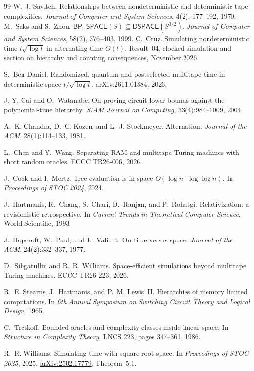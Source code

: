 \documentclass[11pt]{article}
\theoremstyle{remark}
\begin{document}
\begin{thebibliography}{99}
W.~J. Savitch. Relationships between nondeterministic and deterministic
tape complexities. \emph{Journal of Computer and System Sciences},
4(2), 177--192, 1970.
M.~Saks and S.~Zhou. $\mathsf{BP_HSPACE}(S)\subseteq
\mathsf{DSPACE}(S^{3/2})$. \emph{Journal of Computer and System Sciences},
58(2), 376--403, 1999.
C.~Cruz. Simulating nondeterministic time $t\sqrt{\log t}$ in alternating
time $O(t)$. Result~04, clocked simulation and section on hierarchy and
counting consequences, November 2026.

S.~Ben Daniel. Randomized, quantum and postselected multitape time in
deterministic space $t/\sqrt{\log t}$. arXiv:2611.01884, 2026.

J.-Y. Cai and O.~Watanabe. On proving circuit lower bounds against the
polynomial-time hierarchy. \emph{SIAM Journal on Computing},
33(4):984--1009, 2004.

A.~K. Chandra, D.~C. Kozen, and L.~J. Stockmeyer. Alternation.
\emph{Journal of the ACM}, 28(1):114--133, 1981.

L.~Chen and Y.~Wang. Separating RAM and multitape Turing machines with
short random oracles. ECCC TR26-006, 2026.

J.~Cook and I.~Mertz. Tree evaluation is in space
$O(\log n\cdot\log\log n)$. In \emph{Proceedings of STOC 2024}, 2024.

J.~Hartmanis, R.~Chang, S.~Chari, D.~Ranjan, and P.~Rohatgi.
Relativization: a revisionistic retrospective. In \emph{Current Trends in
Theoretical Computer Science}, World Scientific, 1993.

J.~Hopcroft, W.~Paul, and L.~Valiant. On time versus space.
\emph{Journal of the ACM}, 24(2):332--337, 1977.

D.~Sibgatullin and R.~R. Williams. Space-efficient simulations beyond
multitape Turing machines. ECCC TR26-223, 2026.

R.~E. Stearns, J.~Hartmanis, and P.~M. Lewis~II. Hierarchies of memory
limited computations. In \emph{6th Annual Symposium on Switching Circuit
Theory and Logical Design}, 1965.

C.~Tretkoff. Bounded oracles and complexity classes inside linear space.
In \emph{Structure in Complexity Theory}, LNCS 223, pages 347--361, 1986.

R.~R. Williams. Simulating time with square-root space. In
\emph{Proceedings of STOC 2025}, 2025.
\href{https://arxiv.org/pdf/2502.17779}{arXiv:2502.17779}, Theorem~5.1.
\end{thebibliography}
\end{document}
